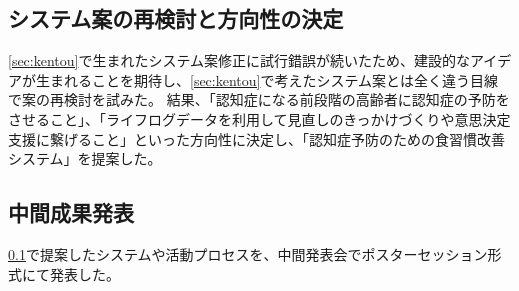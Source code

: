 \documentclass[../report]{subfiles}
\begin{document}
\subsection{システム案の再検討と方向性の決定}\label{sec:saikentou}
\ref{sec:kentou}で生まれたシステム案修正に試行錯誤が続いたため、建設的なアイデアが生まれることを期待し、\ref{sec:kentou}で考えたシステム案とは全く違う目線で案の再検討を試みた。
結果、「認知症になる前段階の高齢者に認知症の予防をさせること」、「ライフログデータを利用して見直しのきっかけづくりや意思決定支援に繋げること」といった方向性に決定し、「認知症予防のための食習慣改善システム」を提案した。

\subsection{中間成果発表}
\ref{sec:saikentou}で提案したシステムや活動プロセスを、中間発表会でポスターセッション形式にて発表した。
\end{document}
